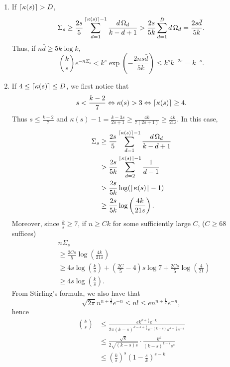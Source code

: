 \documentclass[11pt,onecolumn]{IEEEtran}
\newcommand{\beq}{\begin{equation}}
\newcommand{\eeq}{\end{equation}}
\DeclarePairedDelimiter\ceil{\lceil}{\rceil}
\begin{document}
\begin{enumerate}

\item If $\ceil*{\kappa(s)} > D$,
$$
\Sigma_s \geq \frac{2s}{5} \sum_{d=1}^{\ceil*{\kappa(s)}-1} \frac{d\,\Omega_d}{k-d+1} > \frac{2s}{5k} \sum_{d=1}^{D} d\,\Omega_d = \frac{2s \bar d}{5k}.
$$
Thus, if $n \bar d \geq 5 k \log k$,
$$
\binom{k}{s} e^{-n\Sigma_s} < k^s \exp \left( -\frac{2ns \bar d}{5k} \right) \leq k^s k^{-2s} = k^{-s}.
$$

\item If $4 \leq \ceil*{\kappa(s)} \leq D$, we first notice that
\beq \label{eq:s_kappa}
s < \frac{k-2}{7} \Leftrightarrow \kappa(s) > 3 \Leftrightarrow \ceil*{\kappa(s)} \geq 4.
\eeq
Thus $s \leq \frac{k-2}{7}$ and $\kappa(s) -1 = \frac{k-3s}{2s+1} \geq \frac{4k}{7(2s+1)} \geq \frac{4k}{21s}$. In this case,
\beq\nonumber
\begin{aligned}
\Sigma_s &\geq \frac{2s}{5} \sum_{d=1}^{\ceil*{\kappa(s)}-1} \frac{d\,\Omega_d}{k-d+1} \\
&> \frac{2s}{5k} \sum_{d=2}^{\ceil*{\kappa(s)}-1} \frac{1}{d-1}\\
& > \frac{2s}{5k} \log (\ceil*{\kappa(s)}-1)\\
& \geq \frac{2s}{5k} \log \left( \frac{4k}{21s} \right).
\end{aligned}
\eeq
Moreover, since $\frac{k}{s} \geq 7$, if $n \geq Ck$ for some sufficiently large $C$, ($C\geq 68$ suffices)
\beq\nonumber
\begin{aligned}
&n\Sigma_s \\
&\geq \frac{2Cs}{5} \log \left( \frac{4k}{21s} \right)\\
& \geq 4s \log \left( \frac{k}{s} \right) + \left( \frac{2C}{5} -4 \right) s \log 7 + \frac{2Cs}{5} \log \left( \frac{4}{21} \right)\\
& \geq 4s \log \left( \frac{k}{s} \right).
\end{aligned}
\eeq
From Stirling's formula, we also have that
$$
\sqrt{2\pi} n^{n+\frac{1}{2}} e^{-n} \leq n! \leq e n^{n+\frac{1}{2}} e^{-n},
$$
hence
\begin{equation*} \begin{split}
\binom{k}{s} 
&\leq \frac{e k^{k+\frac{1}{2}} e^{-k}}{2\pi (k-s)^{k-s+\frac{1}{2}} e^{-(k-s)} s^{s+\frac{1}{2}} e^{-s}} \\
&\leq \frac{\sqrt{k}}{2\sqrt{(k-s)s}} \cdot \frac{k^k}{(k-s)^{k-s} s^s} \\
&\leq  \left( \frac{k}{s} \right)^s \left(1-\frac{s}{k} \right)^{s-k} \\

\end{split}
\end{equation*}
\end{enumerate}
\end{document}
